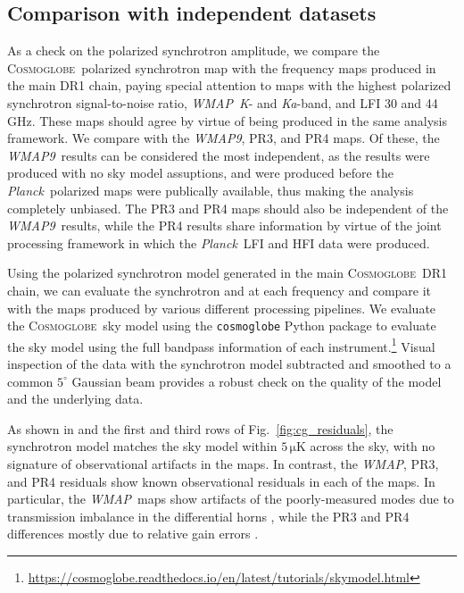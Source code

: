 \documentclass[twocolumn]{../../common/aa}
\def\WMAP{\emph{WMAP}}
\def\WMAPnine{\emph{WMAP9}}
\def\Planck{\emph{Planck}}
\newcommand{\cosmoglobe}{\textsc{Cosmoglobe}}
\newcommand{\K}[0]{\textit K}
\newcommand{\Ka}[0]{\textit{Ka}}
\begin{document}
\subsection{Comparison with independent datasets}

As a check on the polarized synchrotron amplitude, we compare the \cosmoglobe\ polarized synchrotron map with the frequency maps produced in the main DR1 chain, paying special attention to maps with the highest polarized synchrotron signal-to-noise ratio, \WMAP\ \K- and \Ka-band, and LFI 30 and 44\,GHz. These maps should agree by virtue of being produced in the same analysis framework. We compare with the \WMAPnine, PR3, and PR4 maps. Of these, the \WMAPnine\ results can be considered the most independent, as the results were produced with no sky model assuptions, and were produced before the \Planck\ polarized maps were publically available, thus making the analysis completely unbiased. The PR3 and PR4 maps should also be independent of the \WMAPnine\ results, while the PR4 results share information by virtue of the joint processing framework in which the \Planck\ LFI and HFI data were produced.

Using the polarized synchrotron model generated in the main \cosmoglobe\ DR1 chain, we can evaluate the synchrotron and at each frequency and compare it with the maps produced by various different processing pipelines. We evaluate the \cosmoglobe\ sky model using the \texttt{cosmoglobe} Python package to evaluate the sky model using the full bandpass information of each instrument.\footnote{\url{https://cosmoglobe.readthedocs.io/en/latest/tutorials/skymodel.html}} Visual inspection of the data with the synchrotron model subtracted and smoothed to a common $5^\circ$ Gaussian beam provides a robust check on the quality of the model and the underlying data.

As shown in \citet{watts2023_dr1} and the first and third rows of Fig.~\ref{fig:cg_residuals}, the synchrotron model matches the sky model within $5\,\mathrm{\mu K}$ across the sky, with no signature of observational artifacts in the maps. In contrast, the \WMAP, PR3, and PR4 residuals show known observational residuals in each of the maps. In particular, the \WMAP\ maps show artifacts of the poorly-measured modes due to transmission imbalance in the differential horns \citep{jarosik2007,bennett2012}, while the PR3 and PR4 differences mostly due to relative gain errors \citep{planck2016-l02,planck2020-LVII}.
\end{document}
